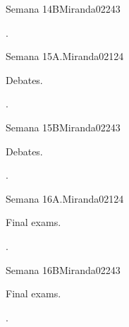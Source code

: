 \begin{syllabus}
\begin{unit}{}{Semana 14B}{Miranda02}{24}{3}
   \begin{learningoutcomes}
      \item . 
      \end{learningoutcomes}
\end{unit}

\begin{unit}{}{Semana 15A.}{Miranda02}{12}{4}
   \begin{topics}
      \item Debates.
   \end{topics}
   \begin{learningoutcomes}
      \item .
   \end{learningoutcomes}
\end{unit}

\begin{unit}{}{Semana 15B}{Miranda02}{24}{3}
   \begin{topics}
      \item Debates.
   \end{topics}

   \begin{learningoutcomes}
      \item . 
      \end{learningoutcomes}
\end{unit}

\begin{unit}{}{Semana 16A.}{Miranda02}{12}{4}
   \begin{topics}
      \item Final exams.
   \end{topics}
   \begin{learningoutcomes}
      \item .
   \end{learningoutcomes}
\end{unit}

\begin{unit}{}{Semana 16B}{Miranda02}{24}{3}
   \begin{topics}
      \item Final exams.
   \end{topics}

   \begin{learningoutcomes}
      \item . 
      \end{learningoutcomes}
\end{unit}


\begin{coursebibliography}
\end{coursebibliography}

\end{syllabus}
